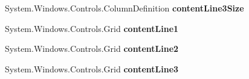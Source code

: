 \begin{DoxyCompactItemize}
System.\+Windows.\+Controls.\+Column\+Definition {\bfseries content\+Line3\+Size}
\item 
\mbox{\label{class_wpf_handler_1_1_u_i_1_1_controls_1_1_logon_1_1_logon_screen_a22cf2a8d5299a6d83b0478e69059d7f3}} 
System.\+Windows.\+Controls.\+Grid {\bfseries content\+Line1}
\item 
\mbox{\label{class_wpf_handler_1_1_u_i_1_1_controls_1_1_logon_1_1_logon_screen_ae011b4eb612f117a976bf95fa18dde6f}} 
System.\+Windows.\+Controls.\+Grid {\bfseries content\+Line2}
\item 
\mbox{\label{class_wpf_handler_1_1_u_i_1_1_controls_1_1_logon_1_1_logon_screen_a33806d21a1c1b41b0c7dcb7c59f5c2fa}} 
System.\+Windows.\+Controls.\+Grid {\bfseries content\+Line3}
\end{DoxyCompactItemize}
